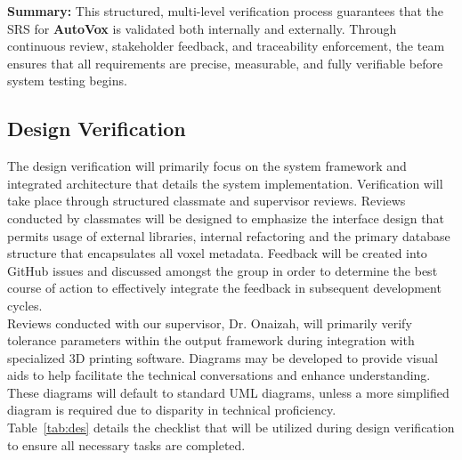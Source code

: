 \documentclass[12pt, titlepage]{article}
\begin{document}
\noindent\textbf{Summary:} This structured, multi-level verification process guarantees that the SRS for \textbf{AutoVox} is validated both internally and externally. Through continuous review, stakeholder feedback, and traceability enforcement, the team ensures that all requirements are precise, measurable, and fully verifiable before system testing begins.\\

\subsection{Design Verification}

\noindent The design verification will primarily focus on the system framework and integrated architecture that details the system implementation. Verification will take place through structured classmate and supervisor reviews. Reviews conducted by classmates will be designed to emphasize the interface design that permits usage of external libraries, internal refactoring and the primary database structure that encapsulates all voxel metadata. Feedback will be created into GitHub issues and discussed amongst the group in order to determine the best course of action to effectively integrate the feedback in subsequent development cycles.\\

\noindent Reviews conducted with our supervisor, Dr. Onaizah, will primarily verify tolerance parameters within the output framework during integration with specialized 3D printing software. Diagrams may be developed to provide visual aids to help facilitate the technical conversations and enhance understanding. These diagrams will default to standard UML diagrams, unless a more simplified diagram is required due to disparity in technical proficiency.\\

\noindent Table~\ref{tab:des} details the checklist that will be utilized during design verification to ensure all necessary tasks are completed.\\
\end{document}
